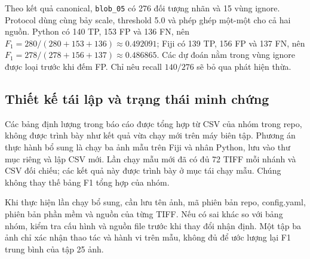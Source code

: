 Theo kết quả canonical, \texttt{blob\_05} có 276 đối tượng nhãn và 15 vùng ignore. Protocol dùng cùng bảy scale, threshold 5.0 và phép ghép một-một cho cả hai nguồn. Python có 140 TP, 153 FP và 136 FN, nên $F_1=280/(280+153+136)\approx0.492091$; Fiji có 139 TP, 156 FP và 137 FN, nên $F_1=278/(278+156+137)\approx0.486865$. Các dự đoán nằm trong vùng ignore được loại trước khi đếm FP. Chỉ nêu recall $140/276$ sẽ bỏ qua phát hiện thừa.

\subsection{Thiết kế tái lập và trạng thái minh chứng}
Các bảng định lượng trong báo cáo được tổng hợp từ CSV của nhóm trong repo, không được trình bày như kết quả vừa chạy mới trên máy biên tập. Phương án thực hành bổ sung là chạy ba ảnh mẫu trên Fiji và nhân Python, lưu vào thư mục riêng và lập CSV mới. Lần chạy mẫu mới đã có đủ 72 TIFF mỗi nhánh và CSV đối chiếu; các kết quả này được trình bày ở mục tái chạy mẫu. Chúng không thay thế bảng F1 tổng hợp của nhóm.

Khi thực hiện lần chạy bổ sung, cần lưu tên ảnh, mã phiên bản repo, config.yaml, phiên bản phần mềm và nguồn của từng TIFF. Nếu có sai khác so với bảng nhóm, kiểm tra cấu hình và nguồn file trước khi thay đổi nhận định. Một tập ba ảnh chỉ xác nhận thao tác và hành vi trên mẫu, không đủ để ước lượng lại F1 trung bình của tập 25 ảnh.
